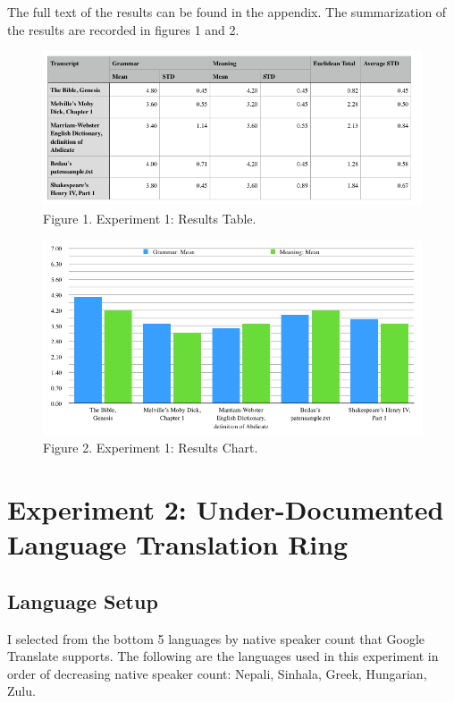 \documentclass{article}
\newcommand{\forcenewpage}{\clearpage \newpage}
\begin{document}
The full text of the results can be found in the appendix.
The summarization of the results are recorded in figures 1 and 2.



\begin{figure}[h]
\centering
\includegraphics[width=15cm,keepaspectratio]{images/exp1-results-table.png}
\captionsetup{labelformat=empty} \caption{Figure 1. Experiment 1: Results Table.}
\end{figure}

\begin{figure}[h]
\centering
\includegraphics[width=15cm,keepaspectratio]{images/exp1-results-chart.png}
\captionsetup{labelformat=empty} \caption{Figure 2. Experiment 1: Results Chart.}
\end{figure}

\section{Experiment 2: Under-Documented Language Translation Ring}\subsection{Language Setup}


I selected from the bottom 5 languages by native speaker count that Google Translate supports. The following are the languages used in this experiment in order of decreasing native speaker count: Nepali, Sinhala, Greek, Hungarian, Zulu.
\end{document}
